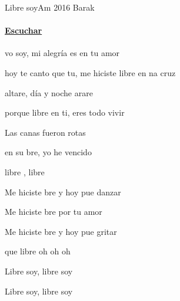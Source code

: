 \documentclass[12pt, spanish]{book}
\newcommand{\NotCCLIed}{\relax}
\begin{document}
    \begin{song}{Libre soy}{Am}
    {2016} %
    {Barak}
    {} %
    {} %
        \ifChordBk
            \paragraph{\mbox{}\hfill\protect\href{https://open.spotify.com/intl-es/track/60zkEkKVPuuIis9HeHOmlI}{Escuchar}\mbox{}\hfill}
        \fi



        \begin{SBOpGroup}
            vo soy, mi alegría es en tu amor

            hoy te canto que tu, me hiciste libre en na cruz

            altare, día y noche arare

            porque libre  en ti, eres todo  vivir
        \end{SBOpGroup}
        \vskip 20pt
        \begin{SBOpGroup}
            Las canas fueron rotas

            en su bre, yo he vencido

            libre , libre 
        \end{SBOpGroup}

        \begin{SBChorus}
            Me hiciste bre y hoy pue danzar

            Me hiciste bre por tu  amor

            Me hiciste bre y hoy pue gritar

            que libre  oh oh oh 
        \end{SBChorus}

        \begin{SBOpGroup}
            Libre soy, libre soy    

            Libre soy, libre soy    


\end{SBOpGroup}
\end{song}
\end{document}
